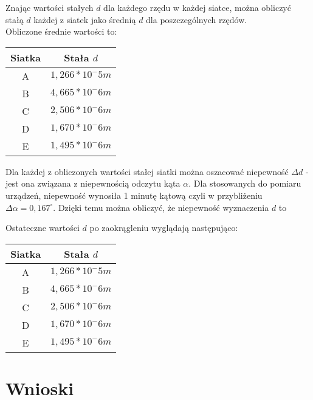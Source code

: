 \documentclass[10pt,a4paper]{article}
\newcommand{\forceindent}{\leavevmode{\parindent=3em\indent}}
\begin{document}
\forceindent Znając wartości stałych $d$ dla każdego rzędu w każdej siatce, można obliczyć stałą $d$ każdej z siatek jako średnią $d$ dla poszczególnych rzędów.\\
Obliczone średnie wartości to:
\begin{center}
\begin{tabular}{|c|c|}
\hline
Siatka & Stała $d$\\
\hline
A & $1,266 * 10^-5 m$\\
\hline
B & $4,665 * 10^-6 m$\\
\hline
C & $2,506 * 10^-6 m$\\
\hline
D & $1,670 * 10^-6 m$\\
\hline
E & $1,495 * 10^-6 m$\\
\hline
\end{tabular}
\end{center}

Dla każdej z obliczonych wartości stałej siatki można oszacować niepewność $\Delta d$ - jest ona związana z niepewnością odczytu kąta $\alpha$. Dla stosowanych do pomiaru urządzeń, 
niepewność wynosiła 1 minutę kątową czyli w przybliżeniu $\Delta \alpha = 0,167^\circ$. Dzięki temu można obliczyć, że niepewność wyznaczenia $d$ to 


Ostateczne wartości $d$ po zaokrągleniu wyglądają następująco:

\begin{center}
\begin{tabular}{|c|c|}
\hline
Siatka & Stała $d$\\
\hline
A & $1,266 * 10^-5 m$\\
\hline
B & $4,665 * 10^-6 m$\\
\hline
C & $2,506 * 10^-6 m$\\
\hline
D & $1,670 * 10^-6 m$\\
\hline
E & $1,495 * 10^-6 m$\\
\hline
\end{tabular}
\end{center}

\section*{Wnioski}
\end{document}
